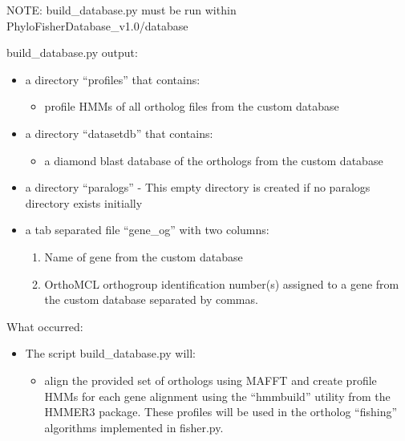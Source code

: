 \documentclass{article}
\begin{document}
\begin{description}
\begin{description}
            \end{description}
            \vspace{0.2cm}
            NOTE: build\_database.py must be run within PhyloFisherDatabase\_v1.0/database\
            \vspace{0.2cm}
            \begin{description}
                \item build\_database.py output:
                \begin{itemize}
                    \item a directory “profiles” that contains:
                    \begin{itemize}
                        \item profile HMMs of all ortholog files from the custom database
                    \end{itemize}
                    \item a directory “datasetdb” that contains:
                    \begin{itemize}
                        \item a diamond blast database of the orthologs from the custom database
                    \end{itemize}
                    \item a directory “paralogs” - This empty directory is created if no paralogs directory exists initially
                    \item a tab separated file “gene\_og” with two columns:
                    \begin{enumerate}
                        \item Name of gene from the custom database
                        \item OrthoMCL orthogroup identification number(s) assigned to a gene from the custom database separated by commas.
                    \end{enumerate}
                \end{itemize}
            \end{description}
            \vspace{0.2cm}
            \item What occurred:
            \begin{itemize}
                \item The script build\_database.py will:
                \begin{itemize}
                    \item align the provided set of orthologs using MAFFT and create profile HMMs for each gene alignment using the “hmmbuild” utility from the HMMER3 package. These profiles will be used in the ortholog “fishing” algorithms implemented in fisher.py.

\end{itemize}
\end{itemize}
\end{description}
\end{document}

